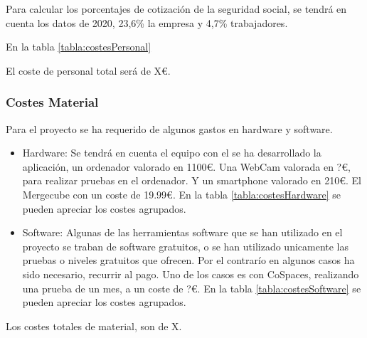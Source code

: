 Para calcular los porcentajes de cotización de la seguridad social, se tendrá en cuenta los datos de 2020, 23,6\% la empresa y 4,7\% trabajadores.

En la tabla \ref{tabla:costesPersonal}

El coste de personal total será de X\euro.


\subsubsection{Costes Material}
Para el proyecto se ha requerido de algunos gastos en hardware y software.

\begin{itemize}
	\item Hardware:
	Se tendrá en cuenta el equipo con el se ha desarrollado la aplicación, un ordenador valorado en 1100\euro. Una WebCam valorada en ?\euro, para realizar pruebas en el ordenador. Y un smartphone valorado en 210\euro. El Mergecube con un coste de 19.99\euro. En la tabla \ref{tabla:costesHardware} se pueden apreciar los costes agrupados.
	\item Software: Algunas de las herramientas software que se han utilizado en el proyecto se traban de software gratuitos, o se han utilizado unicamente las pruebas o niveles gratuitos que ofrecen. Por el contrarío en algunos casos ha sido necesario, recurrir al pago. Uno de los casos es con CoSpaces, realizando una prueba de un mes, a un coste de ?\euro. En la tabla \ref{tabla:costesSoftware} se pueden apreciar los costes agrupados.
\end{itemize}



Los costes totales de material, son de X.



